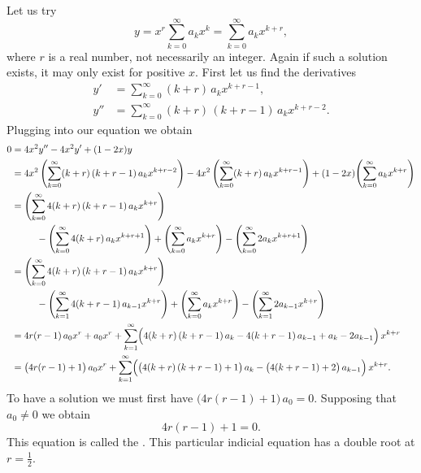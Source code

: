 \documentclass{ximera}
\begin{document}
\begin{exampleSol}
    Let us try
    \begin{equation*}
        y = x^r \sum_{k=0}^\infty a_k x^k = \sum_{k=0}^\infty a_k x^{k+r} ,
    \end{equation*}
    where $r$ is a real number, not necessarily an integer. Again if such a solution exists, it may only exist for positive $x$. First let us find the derivatives
    \begin{align*}
        y' & = \sum_{k=0}^\infty (k+r)\, a_k x^{k+r-1} , \\
        y'' & = \sum_{k=0}^\infty (k+r)\,(k+r-1)\, a_k x^{k+r-2} .
    \end{align*}
    Plugging into our equation we obtain
    \begin{equation*}
        \begin{split}
            0 & = 4x^2y''-4x^2y'+(1-2x)y \\
            &= 4x^2 \, \Biggl( \sum_{k=0}^\infty (k+r)\,(k+r-1) \, a_k x^{k+r-2}  \Biggr) - 4x^2 \, 
            \Biggl( \sum_{k=0}^\infty (k+r) \, a_k x^{k+r-1}  \Biggr) + (1-2x) \Biggl( \sum_{k=0}^\infty a_k x^{k+r} \Biggr) \\
            &= \Biggl( \sum_{k=0}^\infty 4 (k+r)\,(k+r-1) \, a_k x^{k+r}  \Biggr) \\
            & \phantom{mmm} - \Biggl( \sum_{k=0}^\infty 4 (k+r) \, a_k x^{k+r+1}  \Biggr) 
            + \Biggl( \sum_{k=0}^\infty a_k x^{k+r} \Biggr) - \Biggl( \sum_{k=0}^\infty 2a_k x^{k+r+1} \Biggr)\\
            &= \Biggl( \sum_{k=0}^\infty 4 (k+r)\,(k+r-1) \, a_k x^{k+r}  \Biggr) \\
            & \phantom{mmm} - \Biggl( \sum_{k=1}^\infty 4 (k+r-1) \, a_{k-1} x^{k+r}  \Biggr) +
            \Biggl( \sum_{k=0}^\infty a_k x^{k+r} \Biggr) - \Biggl( \sum_{k=1}^\infty 2a_{k-1} x^{k+r} \Biggr) \\
            &= 4r(r-1) \, a_0 x^r  + a_0 x^r +  \sum_{k=1}^\infty \Bigl( 4 (k+r)\,(k+r-1) \, a_k
            - 4 (k+r-1) \, a_{k-1} + a_k - 2a_{k-1} \Bigr) \, x^{k+r}  \\
            &= \bigl( 4r(r-1) + 1 \bigr) \, a_0 x^r +  \sum_{k=1}^\infty \Bigl( \bigl( 4 (k+r)\,(k+r-1) + 1 \bigr) \, a_k - 
            \bigl( 4 (k+r-1) + 2 \bigr) \, a_{k-1} \Bigr) \, x^{k+r} .
        \end{split}
    \end{equation*}
    To have a solution we must first have $\bigl( 4r(r-1) + 1 \bigr) \, a_0 = 0$.  Supposing that $a_0 \not= 0$ we obtain 
    \begin{equation*}
        4r(r-1) + 1 = 0 .
    \end{equation*}
    This equation is called the \emph{}. This particular indicial equation has a double root at $r = \frac{1}{2}$.
    

\end{exampleSol}
\end{document}
